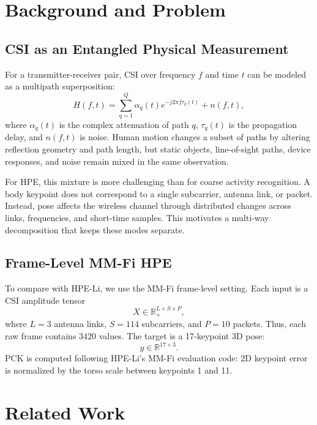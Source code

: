 \documentclass[letterpaper]{article}
\begin{document}
\section{Background and Problem}

\subsection{CSI as an Entangled Physical Measurement}

For a transmitter-receiver pair, CSI over frequency $f$ and time $t$ can be modeled as a multipath superposition:
\begin{equation}
H(f,t)=\sum_{q=1}^{Q}\alpha_q(t)e^{-j2\pi f\tau_q(t)}+n(f,t),
\end{equation}
where $\alpha_q(t)$ is the complex attenuation of path $q$, $\tau_q(t)$ is the propagation delay, and $n(f,t)$ is noise. Human motion changes a subset of paths by altering reflection geometry and path length, but static objects, line-of-sight paths, device responses, and noise remain mixed in the same observation.

For HPE, this mixture is more challenging than for coarse activity recognition. A body keypoint does not correspond to a single subcarrier, antenna link, or packet. Instead, pose affects the wireless channel through distributed changes across links, frequencies, and short-time samples. This motivates a multi-way decomposition that keeps these modes separate.

\subsection{Frame-Level MM-Fi HPE}

To compare with HPE-Li, we use the MM-Fi frame-level setting. Each input is a CSI amplitude tensor
\begin{equation}
X\in \mathbb{R}_{+}^{L\times S\times P},
\end{equation}
where $L=3$ antenna links, $S=114$ subcarriers, and $P=10$ packets. Thus, each raw frame contains $3420$ values. The target is a 17-keypoint 3D pose:
\begin{equation}
y\in\mathbb{R}^{17\times 3}.
\end{equation}
PCK is computed following HPE-Li's MM-Fi evaluation code: 2D keypoint error is normalized by the torso scale between keypoints 1 and 11.

\section{Related Work}
\end{document}
